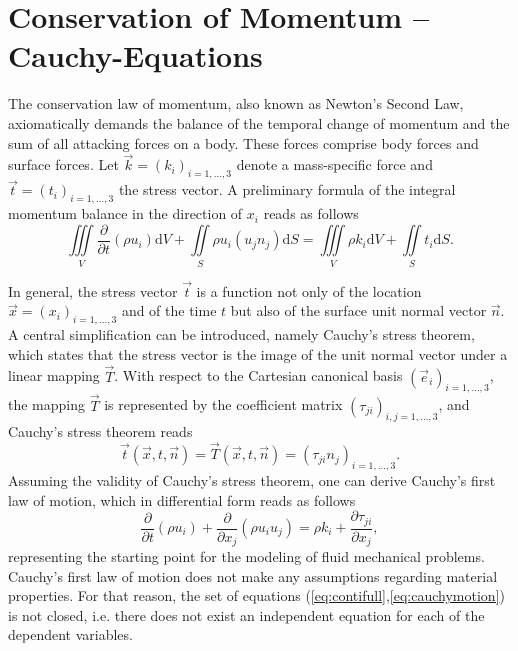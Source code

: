 \section{Conservation of Momentum -- Cauchy-Equations}

The conservation law of momentum, also known as Newton's Second Law, axiomatically demands the balance of the temporal change of momentum and the sum of all attacking forces on a body. These forces comprise body forces and surface forces. Let \(\vec{k} = \left( k_i \right)_{i=1,\dots,3}\) denote a mass-specific force and \(\vec{t} = \left(t_i\right)_{i=1,\dots,3}\) the stress vector. A preliminary formula of the integral momentum balance in the direction of \(x_i\) reads as follows
\begin{equation}
\label{eq:cauchy}
\iiint\limits_V \frac{\partial }{\partial t}\left(\rho u_i \right) \mathrm{d}V + \iint\limits_S \rho u_i \left( u_j n_j \right) \mathrm{d}S = \iiint\limits_V \rho k_i \mathrm{d}V + \iint\limits_S t_i \mathrm{d}S.
\end{equation}

In general, the stress vector \(\vec{t}\) is a function not only of the location \(\vec{x} = \left( x_i \right)_{i = 1,\dots,3}\) and of the time \(t\) but also of the surface unit normal vector \(\vec{n}\). A central simplification can be introduced, namely Cauchy's stress theorem, which states that the stress vector is the image of the unit normal vector under a linear mapping \(\vec{T}\). With respect to the Cartesian canonical basis \(\left(\vec{e}_i \right)_{i = 1, \dots, 3}\), the mapping \(\vec{T}\) is represented by the coefficient matrix \( \left(\tau_{ji}\right)_{i,j = 1,\dots,3}\), and Cauchy's stress theorem reads
\begin{displaymath}
  \vec{t}\left(\vec{x},t,\vec{n}\right) = \vec{T}(\vec{x},t,\vec{n}) = \left(\tau_{ji} n_j\right)_{i = 1, \dots, 3}.
\end{displaymath}
Assuming the validity of Cauchy's stress theorem, one can derive Cauchy's first law of motion, which in differential form reads as follows
\begin{equation}
  \label{eq:cauchymotion}
  \frac{\partial }{\partial t} \left(\rho u_i \right)
  + \frac{\partial}{\partial x_j}\left( \rho u_i u_j \right) 
  = \rho k_i + \frac{\partial \tau_{ji}}{\partial x_j},
\end{equation}
representing the starting point for the modeling of fluid mechanical problems. Cauchy's first law of motion does not make any assumptions regarding material properties. For that reason, the set of equations (\ref{eq:contifull},\ref{eq:cauchymotion}) is not closed, i.e. there does not exist an independent equation for each of the dependent variables.

